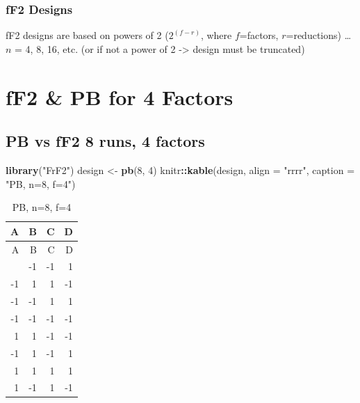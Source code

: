 \documentclass[
  12pt,
  a4paper,
]{article}
\newenvironment{Shaded}{\begin{snugshade}}{\end{snugshade}}
\newcommand{\AttributeTok}[1]{\textcolor[rgb]{0.13,0.29,0.53}{#1}}
\newcommand{\DecValTok}[1]{\textcolor[rgb]{0.00,0.00,0.81}{#1}}
\newcommand{\FunctionTok}[1]{\textcolor[rgb]{0.13,0.29,0.53}{\textbf{#1}}}
\newcommand{\NormalTok}[1]{#1}
\newcommand{\OtherTok}[1]{\textcolor[rgb]{0.56,0.35,0.01}{#1}}
\newcommand{\SpecialCharTok}[1]{\textcolor[rgb]{0.81,0.36,0.00}{\textbf{#1}}}
\newcommand{\StringTok}[1]{\textcolor[rgb]{0.31,0.60,0.02}{#1}}
\numberwithin{equation}{section}
\theoremstyle{plain}
\theoremstyle{definition}
\theoremstyle{remark}
\theoremstyle{note}
\begin{document}
\hypertarget{ff2-designs}{%
\subsubsection{fF2 Designs}\label{ff2-designs}}

fF2 designs are based on powers of 2 (\(2^{(f-r)}\), where
\(f\)=factors, \(r\)=reductions) \ldots{} \(n\) = 4, 8, 16, etc. (or if
not a power of 2 -\textgreater{} design must be truncated)

\newpage

\hypertarget{ff2-pb-for-4-factors}{%
\section{fF2 \& PB for 4 Factors}\label{ff2-pb-for-4-factors}}

\setcounter{table}{0}

\hypertarget{pb-vs-ff2-8-runs-4-factors}{%
\subsection{PB vs fF2 8 runs, 4
factors}\label{pb-vs-ff2-8-runs-4-factors}}

\begin{Shaded}
\begin{Highlighting}[]
\FunctionTok{library}\NormalTok{(}\StringTok{"FrF2"}\NormalTok{)}
\NormalTok{design }\OtherTok{\textless{}{-}} \FunctionTok{pb}\NormalTok{(}\DecValTok{8}\NormalTok{, }\DecValTok{4}\NormalTok{)}
\NormalTok{knitr}\SpecialCharTok{::}\FunctionTok{kable}\NormalTok{(design, }\AttributeTok{align =} \StringTok{"rrrr"}\NormalTok{, }\AttributeTok{caption =} \StringTok{"PB, n=8, f=4"}\NormalTok{)}
\end{Highlighting}
\end{Shaded}

\begin{longtable}[]{@{}rrrr@{}}
\caption{PB, n=8, f=4}\tabularnewline
\toprule\noalign{}
A & B & C & D \\
\midrule\noalign{}
\endfirsthead
\toprule\noalign{}
A & B & C & D \\
\midrule\noalign{}
\endhead
\bottomrule\noalign{}
\endlastfoot
1 & -1 & -1 & 1 \\
-1 & 1 & 1 & -1 \\
-1 & -1 & 1 & 1 \\
-1 & -1 & -1 & -1 \\
1 & 1 & -1 & -1 \\
-1 & 1 & -1 & 1 \\
1 & 1 & 1 & 1 \\
1 & -1 & 1 & -1 \\
\end{longtable}
\end{document}
